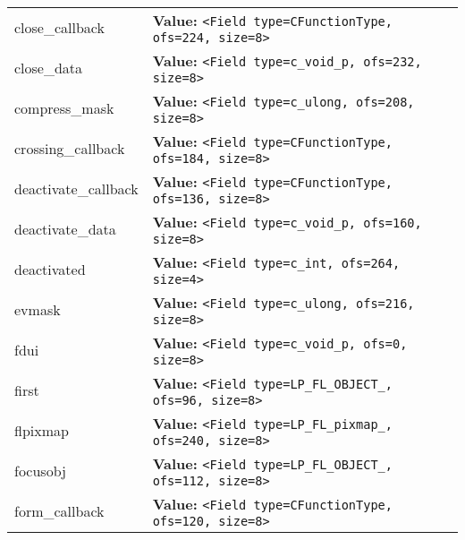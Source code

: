 \begin{longtable}{|p{\varnamewidth}|p{\vardescrwidth}|l}
\cline{1-2}
\raggedright c\-l\-o\-s\-e\-\_\-c\-a\-l\-l\-b\-a\-c\-k\- & \raggedright \textbf{Value:} 
{\tt {\textless}Field type=CFunctionType, ofs=224, size=8{\textgreater}}&\\
\cline{1-2}
\raggedright c\-l\-o\-s\-e\-\_\-d\-a\-t\-a\- & \raggedright \textbf{Value:} 
{\tt {\textless}Field type=c\_void\_p, ofs=232, size=8{\textgreater}}&\\
\cline{1-2}
\raggedright c\-o\-m\-p\-r\-e\-s\-s\-\_\-m\-a\-s\-k\- & \raggedright \textbf{Value:} 
{\tt {\textless}Field type=c\_ulong, ofs=208, size=8{\textgreater}}&\\
\cline{1-2}
\raggedright c\-r\-o\-s\-s\-i\-n\-g\-\_\-c\-a\-l\-l\-b\-a\-c\-k\- & \raggedright \textbf{Value:} 
{\tt {\textless}Field type=CFunctionType, ofs=184, size=8{\textgreater}}&\\
\cline{1-2}
\raggedright d\-e\-a\-c\-t\-i\-v\-a\-t\-e\-\_\-c\-a\-l\-l\-b\-a\-c\-k\- & \raggedright \textbf{Value:} 
{\tt {\textless}Field type=CFunctionType, ofs=136, size=8{\textgreater}}&\\
\cline{1-2}
\raggedright d\-e\-a\-c\-t\-i\-v\-a\-t\-e\-\_\-d\-a\-t\-a\- & \raggedright \textbf{Value:} 
{\tt {\textless}Field type=c\_void\_p, ofs=160, size=8{\textgreater}}&\\
\cline{1-2}
\raggedright d\-e\-a\-c\-t\-i\-v\-a\-t\-e\-d\- & \raggedright \textbf{Value:} 
{\tt {\textless}Field type=c\_int, ofs=264, size=4{\textgreater}}&\\
\cline{1-2}
\raggedright e\-v\-m\-a\-s\-k\- & \raggedright \textbf{Value:} 
{\tt {\textless}Field type=c\_ulong, ofs=216, size=8{\textgreater}}&\\
\cline{1-2}
\raggedright f\-d\-u\-i\- & \raggedright \textbf{Value:} 
{\tt {\textless}Field type=c\_void\_p, ofs=0, size=8{\textgreater}}&\\
\cline{1-2}
\raggedright f\-i\-r\-s\-t\- & \raggedright \textbf{Value:} 
{\tt {\textless}Field type=LP\_FL\_OBJECT\_, ofs=96, size=8{\textgreater}}&\\
\cline{1-2}
\raggedright f\-l\-p\-i\-x\-m\-a\-p\- & \raggedright \textbf{Value:} 
{\tt {\textless}Field type=LP\_FL\_pixmap\_, ofs=240, size=8{\textgreater}}&\\
\cline{1-2}
\raggedright f\-o\-c\-u\-s\-o\-b\-j\- & \raggedright \textbf{Value:} 
{\tt {\textless}Field type=LP\_FL\_OBJECT\_, ofs=112, size=8{\textgreater}}&\\
\cline{1-2}
\raggedright f\-o\-r\-m\-\_\-c\-a\-l\-l\-b\-a\-c\-k\- & \raggedright \textbf{Value:} 
{\tt {\textless}Field type=CFunctionType, ofs=120, size=8{\textgreater}}&\\

\end{longtable}
